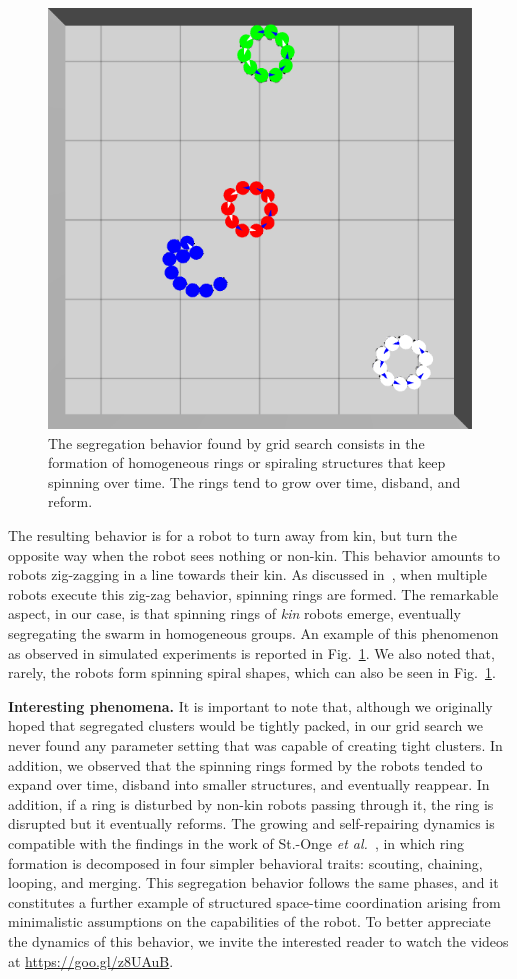 \documentclass[conference]{IEEEtran}
\newcommand{\myparagraph}[1]{\textbf{#1.}}
\begin{document}
\begin{figure}
  \centering
  \includegraphics[width=0.5\linewidth]{./images/rings_example.png}
  \caption{The segregation behavior found by grid search consists in the
    formation of homogeneous rings or spiraling structures that keep spinning
    over time. The rings tend to grow over time, disband, and reform.}
  \label{fig:rings}
\end{figure}
The resulting behavior is for a robot to turn away from kin, but turn the
opposite way when the robot sees nothing or non-kin. This behavior amounts to
robots zig-zagging in a line towards their kin. As discussed
in~\cite{StOnge:IROS2018}, when multiple robots execute this zig-zag behavior,
spinning rings are formed. The remarkable aspect, in our case, is that spinning
rings of \emph{kin} robots emerge, eventually segregating the swarm in
homogeneous groups. An example of this phenomenon as observed in simulated
experiments is reported in Fig.~\ref{fig:rings}. We also noted that, rarely, the
robots form spinning spiral shapes, which can also be seen in
Fig.~\ref{fig:rings}.

\myparagraph{Interesting phenomena}
It is important to note that, although we originally hoped that segregated
clusters would be tightly packed, in our grid search we never found any
parameter setting that was capable of creating tight clusters. In addition, we
observed that the spinning rings formed by the robots tended to expand over
time, disband into smaller structures, and eventually reappear. In addition, if
a ring is disturbed by non-kin robots passing through it, the ring is disrupted
but it eventually reforms. The growing and self-repairing dynamics is compatible
with the findings in the work of St.-Onge \emph{et al.}~\cite{StOnge:IROS2018},
in which ring formation is decomposed in four simpler behavioral traits:
scouting, chaining, looping, and merging. This segregation behavior follows the
same phases, and it constitutes a further example of structured space-time
coordination arising from minimalistic assumptions on the capabilities of the
robot. To better appreciate the dynamics of this behavior, we invite the
interested reader to watch the videos at
\href{https://www.youtube.com/playlist?list=PL9HqYJ1IkIKVX9EsT5BY9LnBsBPTjc5bB}{https://goo.gl/z8UAuB}.
\end{document}
